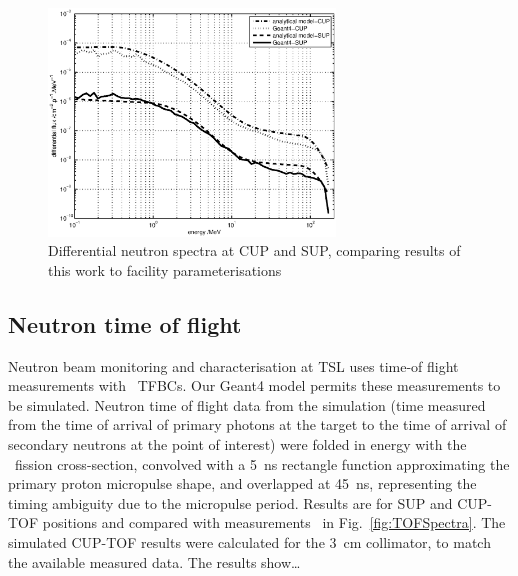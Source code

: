 \documentclass[12pt,journal]{IEEEtran}
\let\MYoriglatexcaption\caption
\renewcommand{\caption}[2][\relax]{\MYoriglatexcaption[#2]{#2}}
\def\U238{\BPChem{\^{238}U}}
\begin{document}
\begin{figure}[t]
    \centering
    \includegraphics[width=3in]{DiffYieldComparedSUPCUP10.eps}
    \caption{Differential neutron spectra at CUP and SUP, comparing results of this work to facility parameterisations~\cite{Prokofiev2009,Prokofiev14}}
    \label{fig:DifferentialSpectra}
\end{figure}

\subsection{Neutron time of flight}

Neutron beam monitoring and characterisation at TSL uses time-of flight measurements with \U238\ TFBCs.
Our Geant4 model permits these measurements to be simulated.
Neutron time of flight data from the simulation (time measured from the time of arrival of primary photons at the target to the time of arrival of secondary neutrons at the point of interest) were folded in energy with the \U238\ fission cross-section, convolved with a \SI{5}{\ns} rectangle function approximating the primary proton micropulse shape, and overlapped at \SI{45}{\ns}, representing the timing ambiguity due to the micropulse period.
Results are for SUP and CUP-TOF positions and compared with measurements~\cite{Prokofiev2009,Prokofiev14} in Fig.~\ref{fig:TOFSpectra}.
The simulated CUP-TOF results were calculated for the \SI{3}{\cm} collimator, to match the available measured data.
The results show\ldots{}
\end{document}
